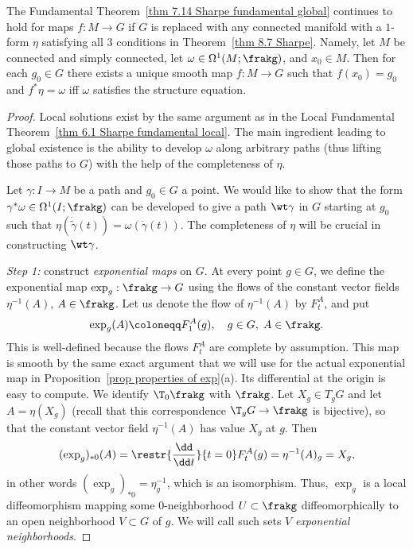 \begin{thm}\label{prop generalization of fundamental thm}
    The Fundamental Theorem~\ref{thm 7.14 Sharpe fundamental global} continues to hold for maps $f:M\to G$ if $G$ is replaced with any connected manifold with a $1$-form $\eta$ satisfying all $3$ conditions in Theorem~\ref{thm 8.7 Sharpe}. Namely, let $M$ be connected and simply connected, let $\omega\in\Omega^1(M;\frakg)$, and $x_0\in M$. Then for each $g_0\in G$ there exists a unique smooth map $f:M\to G$ such that $f(x_0)=g_0$ and $f^\ast\eta=\omega$ iff $\omega$ satisfies the structure equation.
\end{thm}
\begin{proof}
    Local solutions exist by the same argument as in the Local Fundamental Theorem~\ref{thm 6.1 Sharpe fundamental local}. The main ingredient leading to global existence is the ability to develop $\omega$ along arbitrary paths (thus lifting those paths to $G$) with the help of the completeness of $\eta$.

    Let $\gamma:I\to M$ be a path and $g_0\in G$ a point. We would like to show that the form $\gamma^\ast \omega\in \Omega^1(I;\frakg)$ can be developed to give a path $\wt\gamma$ in $G$ starting at $g_0$ such that $\eta(\dot{\tilde\gamma}(t))=\omega(\dot\gamma(t))$. The completeness of $\eta$ will be crucial in constructing $\wt\gamma$.

    \emph{Step 1:} construct \emph{exponential maps} on $G$. At every point $g\in G$, we define the exponential map $\exp_g:\frakg\to G$ using the flows of the constant vector fields $\eta^{-1}(A)$, $A\in\frakg$. Let us denote the flow of $\eta^{-1}(A)$ by $F^A_t$, and put 
    \[\exp_g(A)\coloneqq F^A_1(g),\quad g\in G,\;A\in\frakg.\]
    This is well-defined because the flows $F^A_t$ are complete by assumption. This map is smooth by the same exact argument that we will use for the actual exponential map in Proposition~\ref{prop properties of exp}(a). Its differential at the origin is easy to compute. We identify $\T_0\frakg$ with $\frakg$. Let $X_g\in T_g G$ and let $A=\eta(X_g)$ (recall that this correspondence $\T_g G\to \frakg$ is bijective), so that the constant vector field $\eta^{-1}(A)$ has value $X_g$ at $g$. Then 
    \[(\exp_g)_{\ast 0}(A)=\restr{\frac{\dd}{\dd t}}{t=0}F^A_t(g)=\eta^{-1}(A)_g=X_g,\]
    in other words $(\exp_g)_{\ast 0}=\eta^{-1}_g$, which is an isomorphism. Thus, $\exp_g$ is a local diffeomorphism mapping some $0$-neighborhood $U\subset \frakg$ diffeomorphically to an open neighborhood $V\subset G$ of $g$. We will call such sets $V$ \emph{exponential neighborhoods}.


\end{proof}
